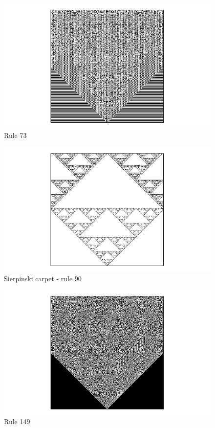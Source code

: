 \begin{figure}
 \centering
 \includegraphics[trim = 40mm 0mm 0mm 0mm, width=1.7\textwidth]{./img/73_500}
 \caption{Rule 73}
\end{figure}


\begin{figure}
 \centering
 \includegraphics[trim = 40mm 0mm 0mm 0mm, width=1.7\textwidth]{./img/90_500}
 \caption{Sierpinski carpet - rule 90}
 \label{koberec}
\end{figure}


\begin{figure}
 \centering
 \includegraphics[trim = 40mm 0mm 0mm 0mm, width=1.7\textwidth]{./img/149_500}
 \caption{Rule 149}
 \label{koberec}
\end{figure}

